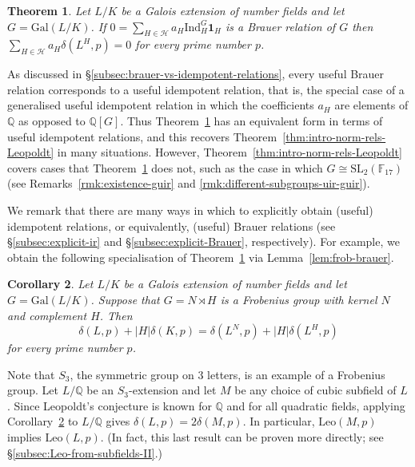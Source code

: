 \documentclass[12pt]{amsart}
\theoremstyle{plain}
\newtheorem{theorem}{Theorem}[section]
\newtheorem{corollary}[theorem]{Corollary}
\theoremstyle{remark}
\theoremstyle{definition}
\newcommand{\Q}{\mathbb{Q}}
\newcommand{\F}{\mathbb{F}}
\newcommand{\Gal}{\mathrm{Gal}}
\newcommand{\Ind}{\mathrm{Ind}}
\newcommand{\Leo}{\mathrm{Leo}}
\numberwithin{equation}{section}
\begin{document}
\begin{theorem}\label{thm:intro-leo-defects}
Let $L/K$ be a Galois extension of number fields and let $G=\Gal(L/K)$. 
If $0=\sum_{H \in \mathcal{H}} a_{H} \Ind_{H}^{G}\mathbf{1}_{H}$ is a Brauer relation of $G$
then $\sum_{H \in \mathcal{H}} a_{H} \delta(L^{H},p) = 0$ for every prime number $p$.
\end{theorem}

As discussed in \S \ref{subsec:brauer-vs-idempotent-relations}, 
every useful Brauer relation corresponds to a useful idempotent relation, that is, 
the special case of a generalised useful idempotent relation in which the coefficients $a_{H}$
are elements of $\Q$ as opposed to $\Q[G]$.
Thus Theorem~\ref{thm:intro-leo-defects} has an equivalent form in terms of 
useful idempotent relations, and this recovers Theorem~\ref{thm:intro-norm-rels-Leopoldt}
in many situations.
However, Theorem~\ref{thm:intro-norm-rels-Leopoldt} covers cases that 
Theorem~\ref{thm:intro-leo-defects} does not, such as the case in which
$G \cong \mathrm{SL}_{2}(\F_{17})$ (see Remarks~\ref{rmk:existence-guir}
and \ref{rmk:different-subgroups-uir-guir}).

We remark that there are many ways in which to explicitly obtain (useful) idempotent relations,
or equivalently, (useful) Brauer relations (see \S \ref{subsec:explicit-ir} and \S \ref{subsec:explicit-Brauer}, 
respectively).
For example, we obtain the following specialisation of Theorem~\ref{thm:intro-leo-defects}
via Lemma~\ref{lem:frob-brauer}.

\begin{corollary}\label{cor:intro-frob-defect-relations}
Let $L/K$ be a Galois extension of number fields and let $G=\Gal(L/K)$.  
Suppose that $G = N \rtimes H$ is a Frobenius group with kernel $N$ and complement $H$.
Then
\[
\delta(L,p) + |H|\delta(K,p) = \delta(L^{N},p) + |H|\delta(L^{H},p)
\] 
for every prime number $p$.
\end{corollary}

Note that $S_{3}$, the symmetric group on $3$ letters, is an example of a Frobenius group.
Let $L/\Q$ be an $S_{3}$-extension and let $M$ be any choice
of cubic subfield of $L$.
Since Leopoldt's conjecture is known for $\Q$ and for all quadratic fields, 
applying Corollary~\ref{cor:intro-frob-defect-relations} to $L/\Q$ gives $\delta(L,p)=2\delta(M,p)$.
In particular, $\Leo(M,p)$ implies $\Leo(L,p)$. 
(In fact, this last result can be proven more directly; see \S \ref{subsec:Leo-from-subfields-II}.)
\end{document}
